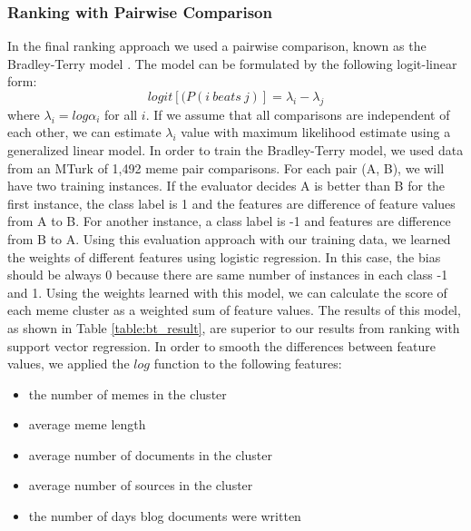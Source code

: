 \documentclass{sig-alternate}
\begin{document}
\subsubsection{Ranking with Pairwise Comparison}
In the final ranking approach we used a pairwise comparison, known as the Bradley-Terry model \cite{Bradley&Terry1952}. The model can be formulated by the following logit-linear form:
\begin{displaymath}
 logit[(P(i\ beats\ j)]=\lambda_i - \lambda_j
\end{displaymath}
where $\lambda_i=log\alpha_i$ for all $i$. If we assume that all comparisons are independent of each other, we can estimate $\lambda_i$ value with maximum likelihood estimate using a generalized linear model. In order to train the Bradley-Terry model, we used data from an MTurk of 1,492 meme pair comparisons. For each pair (A, B), we will have two training instances. If the evaluator decides A is better than B for the first instance, the class label is 1 and the features are difference of feature values from A to B. For another instance, a class label is -1 and features are difference from B to A. Using this evaluation approach with our training data, we learned the weights of different features using logistic regression. In this case, the bias should be always 0 because there are same number of instances in each class -1 and 1. Using the weights learned with this model, we can calculate the score of each meme cluster as a weighted sum of feature values. The results of this model, as shown in Table \ref{table:bt_result}, are superior to our results from ranking with support vector regression. In order to smooth the differences between feature values, we applied the $log$ function to the following features:
\begin{itemize}
 \item the number of memes in the cluster
 \item average meme length
 \item average number of documents in the cluster
 \item average number of sources in the cluster
 \item the number of days blog documents were written
\end{itemize}
\end{document}
